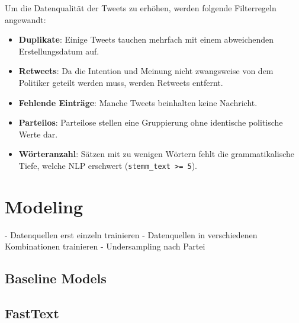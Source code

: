 Um die Datenqualität der Tweets zu erhöhen, werden folgende Filterregeln angewandt:

\begin{itemize}
    \item \textbf{Duplikate}: Einige Tweets tauchen mehrfach mit einem abweichenden Erstellungsdatum auf.
    \item \textbf{Retweets}: Da die Intention und Meinung nicht zwangsweise von dem Politiker geteilt werden muss, werden Retweets entfernt.
    \item \textbf{Fehlende Einträge}: Manche Tweets beinhalten keine Nachricht.
    \item \textbf{Parteilos}: Parteilose stellen eine Gruppierung ohne identische politische Werte dar.
    \item \textbf{Wörteranzahl}: Sätzen mit zu wenigen Wörtern fehlt die grammatikalische Tiefe, welche \ac{NLP} erschwert (\texttt{stemm\_text >= 5}).
\end{itemize}

\section{Modeling} \label{sec:modeling}

- Datenquellen erst einzeln trainieren
- Datenquellen in verschiedenen Kombinationen trainieren
- Undersampling nach Partei 



\subsection{Baseline Models}

\subsection{FastText}


